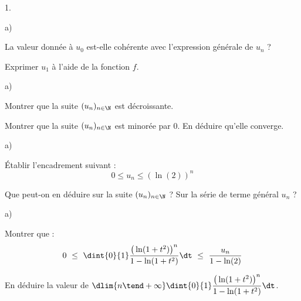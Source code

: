 \documentclass[11pt]{article}%
\begin{document}
\begin{noliste}{1.}
  \setcounter{enumi}{6} %
  \setlength{\itemsep}{4mm}
\item
  \begin{noliste}{a)}
    \setlength{\itemsep}{2mm}
  \item La valeur donnée à $u_0$ est-elle cohérente avec l'expression
    générale de $u_n$ ?

    

  \item Exprimer $u_1$ à l'aide de la fonction $f$.

    
  \end{noliste}

\item
  \begin{noliste}{a)}
    \setlength{\itemsep}{2mm}
  \item Montrer que la suite $(u_n)_{n \in \N}$ est décroissante.

    

  \item Montrer que la suite $(u_n)_{n \in \N}$ est minorée par
    $0$. En déduire qu'elle converge.

    
  \end{noliste}  

\item
  \begin{noliste}{a)}
    \setlength{\itemsep}{2mm}
  \item Établir l'encadrement suivant :
    \[
    0 \leq u_n \leq (\ln(2))^n
    \]

    

  \item Que peut-on en déduire sur la suite $(u_n)_{n \in \N}$ ? Sur
    la série de terme général $u_n$ ?

    
  \end{noliste}  

\item
  \begin{noliste}{a)}
    \setlength{\itemsep}{2mm}
  \item Montrer que : 
    \[
    0 \ \leq \ \dint{0}{1} \dfrac{\big( \ln(1 + t^2) \big)^n}{1 -
      \ln(1 + t^2)} \dt \ \leq \ \dfrac{u_n}{1 - \ln(2)}
    \]

    

  \item En déduire la valeur de $\dlim{n \tend +\infty} \dint{0}{1}
    \dfrac{\big( \ln(1 + t^2) \big)^n}{1 - \ln(1 + t^2)} \dt$.


\end{noliste}
\end{noliste}
\end{document}
